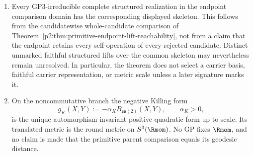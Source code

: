 \documentclass[12pt,a4paper]{article}
\begin{document}
\begin{theorem}
\begin{enumerate}[label=(\roman*), leftmargin=2em]
\item Every GP3-irreducible complete structured realization in the endpoint
comparison domain has the corresponding displayed skeleton.  This follows
from the candidatewise whole-candidate comparison of
Theorem~\ref{p2:thm:primitive-endpoint-lift-reachability}, not from a claim that
the endpoint retains every self-operation of every rejected candidate.
Distinct unmarked
faithful structured lifts over the common skeleton may nevertheless remain
unresolved.  In particular, the theorem does not select a carrier basis,
faithful carrier representation, or metric scale unless a later signature
marks it.

\item On the noncommutative branch the negative Killing form
\[
 g_K(X,Y):=-\alpha_K B_{\mathfrak{su}(2)}(X,Y),\qquad \alpha_K>0,
\]
is the unique automorphism-invariant positive quadratic form up to scale.
Its translated metric is the round metric on \(S^3(\Rmom)\).  No GP fixes
\(\Rmom\), and no claim is made that the primitive parent comparison equals
its geodesic distance.
\end{enumerate}
\end{theorem}
\end{document}
